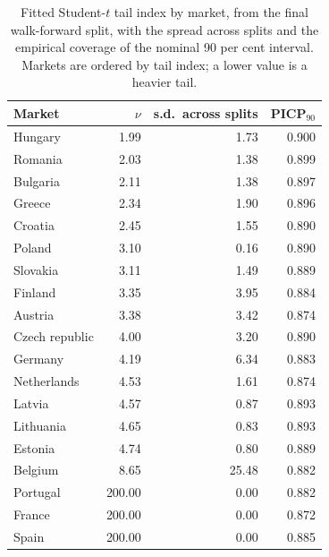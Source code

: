 \begin{table}[htbp]
\centering
\small
\caption{Fitted Student-$t$ tail index by market, from the final walk-forward split, with the spread across splits and the empirical coverage of the nominal 90 per cent interval. Markets are ordered by tail index; a lower value is a heavier tail.}
\label{tab:nu-by-channel}
\begin{tabular}{@{}lrrr@{}}
\toprule
Market & $\nu$ & s.d.\ across splits & PICP$_{90}$ \\
\midrule
Hungary & 1.99 & 1.73 & 0.900 \\
Romania & 2.03 & 1.38 & 0.899 \\
Bulgaria & 2.11 & 1.38 & 0.897 \\
Greece & 2.34 & 1.90 & 0.896 \\
Croatia & 2.45 & 1.55 & 0.890 \\
Poland & 3.10 & 0.16 & 0.890 \\
Slovakia & 3.11 & 1.49 & 0.889 \\
Finland & 3.35 & 3.95 & 0.884 \\
Austria & 3.38 & 3.42 & 0.874 \\
Czech republic & 4.00 & 3.20 & 0.890 \\
Germany & 4.19 & 6.34 & 0.883 \\
Netherlands & 4.53 & 1.61 & 0.874 \\
Latvia & 4.57 & 0.87 & 0.893 \\
Lithuania & 4.65 & 0.83 & 0.893 \\
Estonia & 4.74 & 0.80 & 0.889 \\
Belgium & 8.65 & 25.48 & 0.882 \\
Portugal & 200.00 & 0.00 & 0.882 \\
France & 200.00 & 0.00 & 0.872 \\
Spain & 200.00 & 0.00 & 0.885 \\
\bottomrule
\end{tabular}
\end{table}
